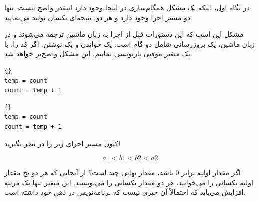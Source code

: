 \documentclass{book}
\begin{document}
    در نگاه اول، اینکه یک مشکل همگام‌سازی در اینجا وجود دارد اینقدر واضح نیست. 
    تنها دو مسیر اجرا وجود دارد و هر دو، نتیجه‌ای یکسان تولید می‌نمایند. 
    
    مشکل این است که این دستورات قبل از اجرا به زبان ماشین ترجمه می‌شوند و در زبان ماشین، یک بروزرسانی شامل دو گام است: یک خواندن 
    و یک نوشتن. اگر کد را، با یک متغیر موقتی  بازنویسی نماییم، این مشکل واضح‌تر خواهد شد. 

\begin{latin}
\begin{minipage}[t]{2in}
\begin{latin}
\begin{lstlisting}[title=\rl{نخ \lr{A}}]{}
temp = count
count = temp + 1
\end{lstlisting}
\end{latin}
\end{minipage}
\hfill
\begin{minipage}[t]{2in}
\begin{latin}
\begin{lstlisting}[title=\rl{نخ \lr{B}}]{}
temp = count
count = temp + 1
\end{lstlisting}
\end{latin}
\end{minipage}
\end{latin}

    اکنون مسیر اجرای زیر را در نظر بگیرید
    
\[  a1 < b1 < b2 < a2  \]

    اگر مقدار اولیه  برابر \texttt{$0$} باشد، مقدار نهایی چند است؟
    از آنجایی که هر دو نخ مقدار اولیه یکسانی را می‌خوانند، هر دو مقدار یکسانی را می‌نویسند. 
    این متغیر تنها یک مرتبه افزایش می‌یابد که احتمالاً آن چیزی نیست که برنامه‌نویس در ذهن خود داشته است. 
\end{document}
